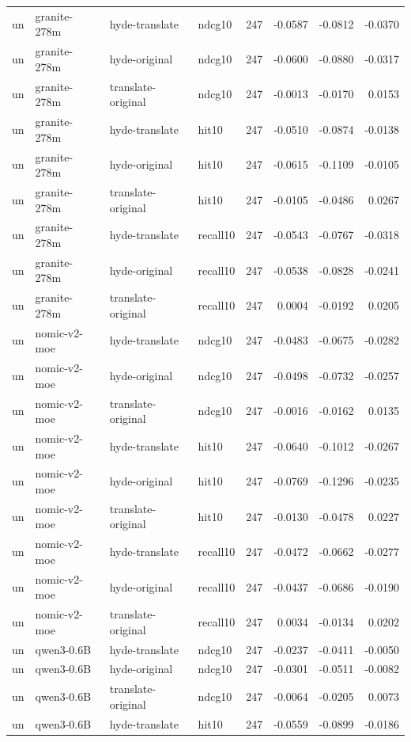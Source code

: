 \begin{tabular}{llllrrrr}
un & granite-278m & hyde-translate & ndcg10 & 247 & -0.0587 & -0.0812 & -0.0370 \\
un & granite-278m & hyde-original & ndcg10 & 247 & -0.0600 & -0.0880 & -0.0317 \\
un & granite-278m & translate-original & ndcg10 & 247 & -0.0013 & -0.0170 & 0.0153 \\
un & granite-278m & hyde-translate & hit10 & 247 & -0.0510 & -0.0874 & -0.0138 \\
un & granite-278m & hyde-original & hit10 & 247 & -0.0615 & -0.1109 & -0.0105 \\
un & granite-278m & translate-original & hit10 & 247 & -0.0105 & -0.0486 & 0.0267 \\
un & granite-278m & hyde-translate & recall10 & 247 & -0.0543 & -0.0767 & -0.0318 \\
un & granite-278m & hyde-original & recall10 & 247 & -0.0538 & -0.0828 & -0.0241 \\
un & granite-278m & translate-original & recall10 & 247 & 0.0004 & -0.0192 & 0.0205 \\
un & nomic-v2-moe & hyde-translate & ndcg10 & 247 & -0.0483 & -0.0675 & -0.0282 \\
un & nomic-v2-moe & hyde-original & ndcg10 & 247 & -0.0498 & -0.0732 & -0.0257 \\
un & nomic-v2-moe & translate-original & ndcg10 & 247 & -0.0016 & -0.0162 & 0.0135 \\
un & nomic-v2-moe & hyde-translate & hit10 & 247 & -0.0640 & -0.1012 & -0.0267 \\
un & nomic-v2-moe & hyde-original & hit10 & 247 & -0.0769 & -0.1296 & -0.0235 \\
un & nomic-v2-moe & translate-original & hit10 & 247 & -0.0130 & -0.0478 & 0.0227 \\
un & nomic-v2-moe & hyde-translate & recall10 & 247 & -0.0472 & -0.0662 & -0.0277 \\
un & nomic-v2-moe & hyde-original & recall10 & 247 & -0.0437 & -0.0686 & -0.0190 \\
un & nomic-v2-moe & translate-original & recall10 & 247 & 0.0034 & -0.0134 & 0.0202 \\
un & qwen3-0.6B & hyde-translate & ndcg10 & 247 & -0.0237 & -0.0411 & -0.0050 \\
un & qwen3-0.6B & hyde-original & ndcg10 & 247 & -0.0301 & -0.0511 & -0.0082 \\
un & qwen3-0.6B & translate-original & ndcg10 & 247 & -0.0064 & -0.0205 & 0.0073 \\
un & qwen3-0.6B & hyde-translate & hit10 & 247 & -0.0559 & -0.0899 & -0.0186 \\

\end{tabular}
